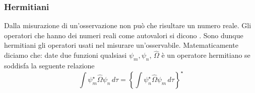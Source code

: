 \subsubsection{Hermitiani}
Dalla misurazione di un'osservazione non può che risultare un numero reale. Gli operatori che hanno dei numeri reali come autovalori si dicono \textbf{}. Sono dunque hermitiani gli operatori usati nel misurare un'osservabile. Matematicamente diciamo che: date due funzioni qualsiasi $\psi_m, \psi_n$, $\hat{\Omega}$ è un operatore hermitiano se soddisfa la seguente relazione
$$\int \psi_m^{\star} \hat{\Omega} \psi_n\, d\tau = \left \{ \int \psi_n^{\star} \hat{\Omega} \psi_m\, d\tau \right \}^{\star}$$
